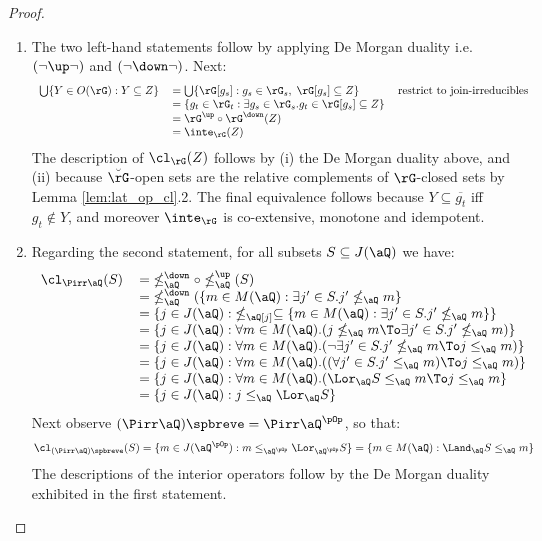 \documentclass{article}
\begin{document}
\begin{proof}
\item
\begin{enumerate}
\item
The two left-hand statements follow by applying De Morgan duality i.e.\ $(\neg\up\neg)$ and $(\neg\down\neg)$. Next:
\[
\begin{tabular}{lll}
$\bigcup \{ Y \in O(\rG) : Y \subseteq Z \}$
&
$= \bigcup \{ \rG[g_s] : g_s \in \rG_s,\; \rG[g_s] \subseteq Z \}$
& restrict to join-irreducibles
\\&
$= \{ g_t \in \rG_t : \exists g_s \in \rG_s. g_t \in \rG[g_s] \subseteq Z \}$
\\&
$= \rG^\up \circ \rG^\down(Z)$
\\&
$= \inte_\rG(Z)$
\end{tabular}
\]
The description of $\cl_\rG(Z)$ follows by (i) the De Morgan duality above, and (ii) because $\breve{\rG}$-open sets are the relative complements of $\rG$-closed sets by Lemma \ref{lem:lat_op_cl}.2. The final equivalence follows because $Y \subseteq \overline{g_t}$ iff $g_t \nin Y$, and moreover $\inte_\rG$ is co-extensive, monotone and idempotent.


\item
Regarding the second statement, for all subsets $S \subseteq J(\aQ)$ we have:
\[
\begin{tabular}{lll}
$\cl_{\Pirr\aQ} (S)$
& $= \; \nleq_\aQ^\down \circ \nleq_\aQ^\up (S)$
\\&
$= \; \nleq_\aQ^\down (\{ m \in M(\aQ) : \exists j' \in S. j' \nleq_\aQ m \}$
\\&
$= \{ j \in J(\aQ) : \;\nleq_\aQ[j] \subseteq \{ m \in M(\aQ) : \exists j' \in S. j' \nleq_\aQ m \} \}$
\\&
$= \{ j \in J(\aQ) : \forall m \in M(\aQ).( j \nleq_\aQ m \To \exists j' \in S. j' \nleq_\aQ m ) \}$
\\&
$= \{ j \in J(\aQ) : \forall m \in M(\aQ).( \neg\exists j' \in S. j' \nleq_\aQ m \To j \leq_\aQ m  ) \}$
\\&
$= \{ j \in J(\aQ) : \forall m \in M(\aQ).( (\forall j' \in S. j' \leq_\aQ m) \To j \leq_\aQ m ) \}$
\\&
$= \{ j \in J(\aQ) : \forall m \in M(\aQ).( \Lor_\aQ S \leq_\aQ m \To j \leq_\aQ m \}$
\\&
$= \{ j \in J(\aQ) : j \leq_\aQ \Lor_\aQ S \} $
\end{tabular}
\]
Next observe $(\Pirr\aQ)\spbreve = \Pirr\aQ^{\pOp}$, so that:
\[
\cl_{(\Pirr\aQ)\spbreve}(S) 
= \{ m \in J(\aQ^{\pOp}) : m \leq_{\aQ^{\pOp}} \Lor_{\aQ^{\pOp}} S \}
= \{ m \in M(\aQ) : \Land_\aQ S \leq_\aQ m \}
\]
The descriptions of the interior operators follow by the De Morgan duality exhibited in the first statement.

\end{enumerate}
\end{proof}
\end{document}
